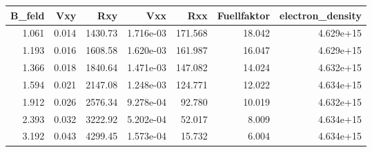 \begin{tabular}{rrrrrrr}
\toprule
 B\_feld &    Vxy &      Rxy &        Vxx &      Rxx &  Fuellfaktor &  electron\_density \\
\midrule
  1.061 &  0.014 &  1430.73 &  1.716e-03 &  171.568 &       18.042 &         4.629e+15 \\
  1.193 &  0.016 &  1608.58 &  1.620e-03 &  161.987 &       16.047 &         4.629e+15 \\
  1.366 &  0.018 &  1840.64 &  1.471e-03 &  147.082 &       14.024 &         4.632e+15 \\
  1.594 &  0.021 &  2147.08 &  1.248e-03 &  124.771 &       12.022 &         4.634e+15 \\
  1.912 &  0.026 &  2576.34 &  9.278e-04 &   92.780 &       10.019 &         4.632e+15 \\
  2.393 &  0.032 &  3222.92 &  5.202e-04 &   52.017 &        8.009 &         4.634e+15 \\
  3.192 &  0.043 &  4299.45 &  1.573e-04 &   15.732 &        6.004 &         4.634e+15 \\
\bottomrule
\end{tabular}

